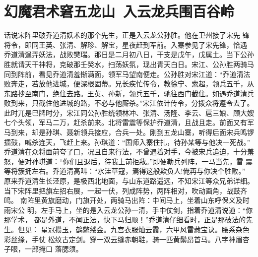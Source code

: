 \chapter{幻魔君术窘五龙山~入云龙兵围百谷岭}

话说宋阵里破乔道清妖术的那个先生，正是入云龙公孙胜。他在卫州接了宋先
锋将令，即同王英、张清、解珍、解宝，星夜赶到军前。入寨参见了宋先锋，恰遇
乔道清逞弄妖法，战败樊瑞。那日是二月初八日，干支是戊午，戊属土。当下公孙
胜就请天干神将，克破那壬癸水，扫荡妖氛，现出青天白日。宋江、公孙胜两骑马
同到阵前，看见乔道清羞惭满面，领军马望南便走。公孙胜对宋江道：“乔道清法
败奔走，若放他进城，便深根固蒂。兄长疾忙传令，教徐宁、索超，领兵五千，从
东路抄至南门，绝住去路。王英、孙新，领兵五千，驰往西门截住。如遇乔道清兵
败到来，只截住他进城的路，不必与他厮杀。”宋江依计传令，分拨众将遵令去了。
此时兀是巳牌时分，宋江同公孙胜统领林冲、张清、汤隆、李云、扈三娘、顾大嫂
七个头领，军马二万，赶杀前来。北将雷震等保护乔道清，且战且走。前面又有军
马到来，却是孙琪、聂新领兵接应，合兵一处。刚到五龙山寨，听得后面宋兵鸣锣
擂鼓，喊杀连天，飞赶上来。孙琪道：“国师入寨住扎，待孙某等与他决一死战。”
乔道清在众将面前夸了口，况且自来行法，不曾遇着对手，今被宋兵追迫，十分羞
怒，便对孙琪道：“你们且退后，待我上前拒敌。”即便勒兵列阵，一马当先，雷
震等将簇拥左右。乔道清高叫：“水洼草寇，焉得这般欺负人!俺再与你决个胜败。”
原来乔道清生长泾原，是极西北地面，与山东道路遥远，不知宋江等众兄弟详细。
当下宋阵里把旗左招右展，一起一伏，列成阵势，两阵相对，吹动画角，战鼓齐鸣。
南阵里黄旗磨动，门旗开处，两骑马出阵：中间马上，坐着山东呼保义及时雨宋公
明，左手马上，坐的是入云龙公孙一清，手中仗剑，指着乔道清说道：“你那学术，
都是外道，不闻正法，快下马归顺！”乔道清仔细看时，正是那破法的先生。但见：
星冠攒玉，鹤氅缕金。九宫衣服灿云霞，六甲风雷藏宝诀。腰系杂色彩丝绦，手仗
松纹古定剑。穿一双云缝赤朝鞋，骑一匹黄鬃昂首马。八字神眉杏子眼，一部掩口
落腮须。

